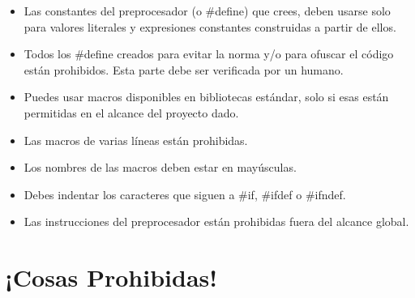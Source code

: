 \documentclass{42-es}
\begin{document}
\begin{itemize}

      \item Las constantes del preprocesador (o \#define) que crees, deben
            usarse solo para valores literales y expresiones constantes
            construidas a partir de ellos.
      \item Todos los \#define creados para evitar la norma y/o para ofuscar
            el código están prohibidos. Esta parte debe ser verificada por un
            humano.
      \item Puedes usar macros disponibles en bibliotecas estándar, solo si
            esas están permitidas en el alcance del proyecto dado.
      \item Las macros de varias líneas están prohibidas.
      \item Los nombres de las macros deben estar en mayúsculas.
      \item Debes indentar los caracteres que siguen a \#if, \#ifdef o
            \#ifndef.
      \item Las instrucciones del preprocesador están prohibidas fuera del
            alcance global.
\end{itemize}
\newpage

\section{¡Cosas Prohibidas!}
\end{document}
